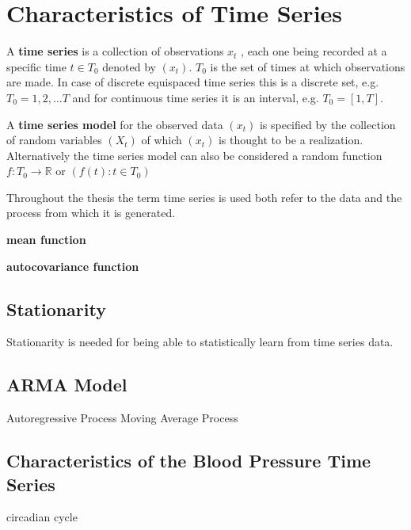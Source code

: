 

\chapter{Characteristics of Time Series}

A \textbf{time series} is a collection of observations $x_t$ , each one being recorded at a specific time $t \in T_0$ denoted by
$(x_t)$.
$T_0$ is the set of times at which observations are made.
In case of discrete equispaced time series this is a discrete set, e.g. $T_0 = {1, 2, \dots T}$
and for continuous time series it is an interval, e.g. $T_0 = [1, T]$.

A \textbf{time series model} for the observed data $(x_t)$ is specified by the collection of random variables
$(X_t)$ of which $(x_t)$ is thought to be a realization.
Alternatively the time series model can also be considered a random function $f: T_0 \to \mathbb{R}$ or
$(f(t): t \in T_0)$


Throughout the thesis the term time series is used both refer to the data and the process from which it is generated.


\textbf{mean function}

\textbf{autocovariance function}


\section{Stationarity}
Stationarity is needed for being able to statistically learn from time series data.



\section{ARMA Model}

Autoregressive Process
Moving Average Process



\section{Characteristics of the Blood Pressure Time Series}

circadian cycle






